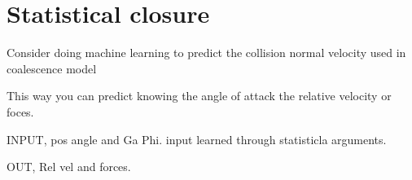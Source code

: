 \section{Statistical closure}

Consider doing machine learning to predict the collision normal velocity used in coalescence model

This way you can predict knowing the angle of attack the relative velocity or foces. 

INPUT, pos angle and Ga Phi. 
input learned through statisticla arguments. 

OUT, Rel vel and forces. 

